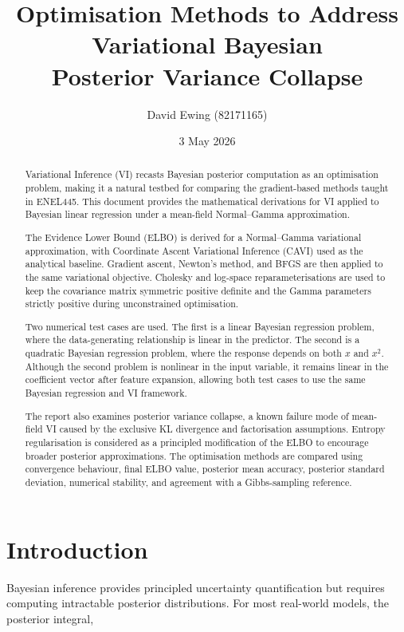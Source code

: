 \documentclass[11pt,a4paper]{article}
\title{ 
Optimisation Methods to Address\\
Variational Bayesian\\
Posterior Variance Collapse
}
\author{
  David Ewing (82171165)\\
}
\date{3 May 2026}
\begin{document}
\maketitle

\begin{abstract}
\setlength{\parindent}{0pt}
\setlength{\parskip}{0.7em}

 Variational Inference (VI) recasts Bayesian posterior computation as an optimisation problem, making it a natural testbed for comparing the
gradient-based methods taught in ENEL445. This document provides the mathematical derivations for VI applied to Bayesian linear regression under
a mean-field Normal--Gamma approximation.

The Evidence Lower Bound (ELBO) is derived for a Normal--Gamma variational approximation, with Coordinate Ascent Variational Inference (CAVI) used as the analytical baseline. Gradient ascent, Newton's method, and BFGS are then applied to the same variational objective. Cholesky and log-space reparameterisations are used to keep the covariance matrix symmetric positive definite and the Gamma parameters strictly positive during unconstrained optimisation.

Two numerical test cases are used. The first is a linear Bayesian regression problem, where the data-generating relationship is linear in the predictor. The second is a quadratic Bayesian regression problem, where the response depends on both $x$ and $x^2$. Although the second problem is nonlinear in the input variable, it remains linear in the coefficient vector after feature expansion, allowing both test cases to use the same Bayesian regression and VI framework.

The report also examines posterior variance collapse, a known failure mode of mean-field VI caused by the exclusive KL divergence and factorisation assumptions. Entropy regularisation is considered as a principled modification of the ELBO to encourage broader posterior approximations. The optimisation methods are compared using convergence behaviour, final ELBO value, posterior mean accuracy, posterior standard deviation, numerical stability, and agreement with a Gibbs-sampling reference.
\end{abstract}
\newpage
\section*{Introduction}

Bayesian inference provides principled uncertainty quantification but requires computing intractable posterior distributions. For most real-world models, the posterior integral,
\end{document}
